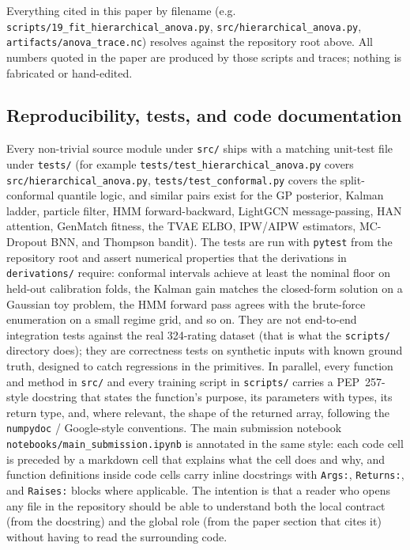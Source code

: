 \documentclass{article}
\begin{document}
Everything cited in this paper by filename (e.g. \texttt{scripts/19\_fit\_hierarchical\_anova.py}, \texttt{src/hierarchical\_anova.py}, \texttt{artifacts/anova\_trace.nc}) resolves against the repository root above. All numbers quoted in the paper are produced by those scripts and traces; nothing is fabricated or hand-edited.

\subsection*{Reproducibility, tests, and code documentation}

Every non-trivial source module under \texttt{src/} ships with a matching unit-test file under \texttt{tests/} (for example \texttt{tests/test\_hierarchical\_anova.py} covers \texttt{src/hierarchical\_anova.py}, \texttt{tests/test\_conformal.py} covers the split-conformal quantile logic, and similar pairs exist for the GP posterior, Kalman ladder, particle filter, HMM forward-backward, LightGCN message-passing, HAN attention, GenMatch fitness, the TVAE ELBO, IPW/AIPW estimators, MC-Dropout BNN, and Thompson bandit). The tests are run with \texttt{pytest} from the repository root and assert numerical properties that the derivations in \texttt{derivations/} require: conformal intervals achieve at least the nominal floor on held-out calibration folds, the Kalman gain matches the closed-form solution on a Gaussian toy problem, the HMM forward pass agrees with the brute-force enumeration on a small regime grid, and so on. They are not end-to-end integration tests against the real 324-rating dataset (that is what the \texttt{scripts/} directory does); they are correctness tests on synthetic inputs with known ground truth, designed to catch regressions in the primitives. In parallel, every function and method in \texttt{src/} and every training script in \texttt{scripts/} carries a PEP~257-style docstring that states the function's purpose, its parameters with types, its return type, and, where relevant, the shape of the returned array, following the \texttt{numpydoc} / Google-style conventions. The main submission notebook \texttt{notebooks/main\_submission.ipynb} is annotated in the same style: each code cell is preceded by a markdown cell that explains what the cell does and why, and function definitions inside code cells carry inline docstrings with \texttt{Args:}, \texttt{Returns:}, and \texttt{Raises:} blocks where applicable. The intention is that a reader who opens any file in the repository should be able to understand both the local contract (from the docstring) and the global role (from the paper section that cites it) without having to read the surrounding code.
\end{document}
